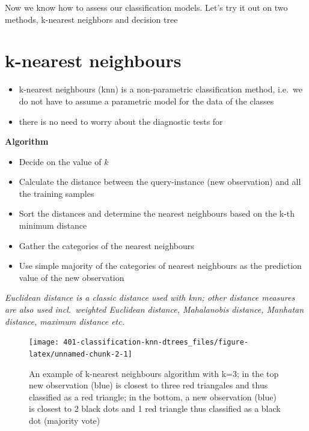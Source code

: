 \documentclass[
]{book}
\providecommand{\tightlist}{%
  \setlength{\itemsep}{0pt}\setlength{\parskip}{0pt}}
\theoremstyle{definition}
\theoremstyle{definition}
\theoremstyle{definition}
\theoremstyle{remark}
\begin{document}
Now we know how to assess our classification models. Let's try it out on two methods, k-nearest neighbors and decision tree

\hypertarget{k-nearest-neighbours}{%
\section{k-nearest neighbours}\label{k-nearest-neighbours}}

\begin{itemize}
\tightlist
\item
  k-nearest neighbours (knn) is a non-parametric classification method, i.e.~we do not have to assume a parametric model for the data of the classes
\item
  there is no need to worry about the diagnostic tests for
\end{itemize}

\textbf{Algorithm}

\begin{itemize}
\tightlist
\item
  Decide on the value of \(k\)
\item
  Calculate the distance between the query-instance (new observation) and all the training samples
\item
  Sort the distances and determine the nearest neighbours based on the k-th minimum distance
\item
  Gather the categories of the nearest neighbours
\item
  Use simple majority of the categories of nearest neighbours as the prediction value of the new observation
\end{itemize}

\emph{Euclidean distance is a classic distance used with knn; other distance measures are also used incl.~weighted Euclidean distance, Mahalanobis distance, Manhatan distance, maximum distance etc.}

\begin{figure}

{\centering \texttt{[image: 401-classification-knn-dtrees\_files/figure-latex/unnamed-chunk-2-1]} 

}

\caption{An example of k-nearest neighbours algorithm with k=3; in the top new observation (blue) is closest to three red triangales and thus classified as a red triangle; in the bottom, a new observation (blue) is closest to 2 black dots and 1 red triangle thus classified as a black dot (majority vote)}\label{fig:unnamed-chunk-2}
\end{figure}
\end{document}
